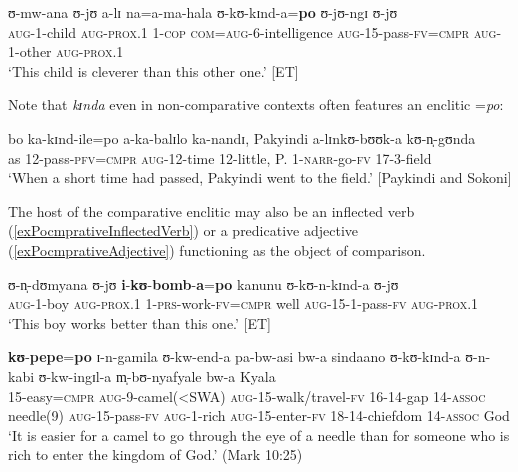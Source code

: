 \begin{exe}
	\ex \gll ʊ-mw-ana ʊ-jʊ a-lɪ na=a-ma-hala ʊ-kʊ-kɪnd-a=\textbf{po} ʊ-jʊ-ngɪ ʊ-jʊ\\
	\textsc{aug}-1-child \textsc{aug}-\textsc{prox.1} 1-\textsc{cop} \textsc{com}=\textsc{aug}-6-intelligence \textsc{aug}-15-pass-\textsc{fv}=\textsc{cmpr} \textsc{aug}-1-other \textsc{aug}-\textsc{prox.1}\\
	\glt \lq This child is cleverer than this other one.' [ET]
\end{exe}
Note that \textit{kɪnda} even in non-comparative contexts often features an enclitic =\textit{po}:
\begin{exe}
	\ex\label{exkindapononcomparative} \gll bo ka-kɪnd-ile=po a-ka-balɪlo ka-nandɪ, Pakyindi a-lɪnkʊ-bʊʊk-a kʊ-n̩-gʊnda\\
	as 12-pass-\textsc{pfv}=\textsc{cmpr} \textsc{aug}-12-time 12-little, P. 1-\textsc{narr}-go-\textsc{fv} 17-3-field\\
	\glt \lq When a short time had passed, Pakyindi went to the field.' [Paykindi and Sokoni]
\end{exe}

The host of the comparative enclitic may also be an inflected verb (\ref{exPocmprativeInflectedVerb}) or a predicative adjective (\ref{exPocmprativeAdjective}) functioning as the object of comparison.
\begin{exe}
	\ex \label{exPocmprativeInflectedVerb}
	\gll ʊ-n̩-dʊmyana ʊ-jʊ \textbf{i}-\textbf{kʊ}-\textbf{bomb}-\textbf{a}=\textbf{po} kanunu ʊ-kʊ-n-kɪnd-a ʊ-jʊ\\
	\textsc{aug}-1-boy \textsc{aug}-\textsc{prox.1} 1-\textsc{prs}-work-\textsc{fv}=\textsc{cmpr} well \textsc{aug}-15-1-pass-\textsc{fv} \textsc{aug}-\textsc{prox.1}\\
	\glt \lq This boy works better than this one.' [ET]
	
	\ex \label{exPocmprativeAdjective}
	\gll \textbf{kʊ}-\textbf{pepe}=\textbf{po} ɪ-n-gamila ʊ-kw-end-a pa-bw-asi bw-a sindaano ʊ-kʊ-kɪnd-a ʊ-n-kabi ʊ-kw-ingɪl-a m̩-bʊ-nyafyale bw-a Kyala\\
	15-easy=\textsc{cmpr} \textsc{aug}-9-camel(<SWA) \textsc{aug}-15-walk/travel-\textsc{fv} 16-14-gap 14-\textsc{assoc} needle(9) \textsc{aug}-15-pass-\textsc{fv} \textsc{aug}-1-rich \textsc{aug}-15-enter-\textsc{fv} 18-14-chiefdom 14-\textsc{assoc} God\\
	\glt \lq It is easier for a camel to go through the eye of a needle than for someone who is rich to enter the kingdom of God.' (Mark 10:25)
\end{exe}

